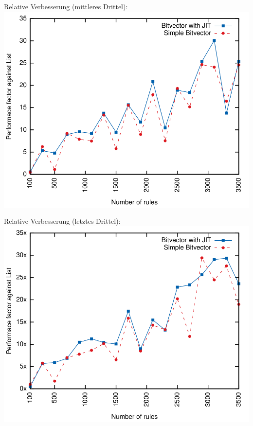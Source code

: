 \documentclass[xcolor=x11names,compress]{beamer}
\renewcommand{\(}{\begin{columns}}
\renewcommand{\)}{\end{columns}}
\newcommand{\<}[1]{\begin{column}{#1}}
\renewcommand{\>}{\end{column}}
\begin{document}
\begin{frame}[noframenumbering]
  Relative Verbesserung (mittleres Drittel):
  \includegraphics[height=0.9\textheight]{figures/eval_a_relative}
\end{frame}

\begin{frame}[noframenumbering]
  Relative Verbesserung (letztes Drittel):
  \includegraphics[height=0.9\textheight]{figures/eval_w_relative}
\end{frame}
\end{document}
